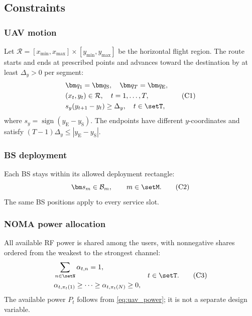 \subsection{Constraints}
\subsubsection{UAV motion}
Let $\mathcal R=[x_{\min},x_{\max}]\times[y_{\min},y_{\max}]$ be the horizontal flight region. The route starts and ends at prescribed points and advances toward the destination by at least $\Delta_y>0$ per segment:
\begin{equation}
\begin{aligned}
&\bm q_1=\bm q_{\mathrm S},\quad \bm q_T=\bm q_{\mathrm E},\\
&(x_t,y_t)\in\mathcal R,\quad t=1,\ldots,T,\\
&s_y(y_{t+1}-y_t)\ge\Delta_y,\quad t\in\setT,
\end{aligned}
\tag{C1}\label{eq:c_motion}
\end{equation}
where $s_y=\operatorname{sign}(y_{\mathrm E}-y_{\mathrm S})$. The endpoints have different $y$-coordinates and satisfy $(T-1)\Delta_y\le|y_{\mathrm E}-y_{\mathrm S}|$.

\subsubsection{BS deployment}
Each BS stays within its allowed deployment rectangle:
\begin{equation}
\bm s_m\in\mathcal B_m,\qquad m\in\setM.
\tag{C2}\label{eq:c_bs}
\end{equation}
The same BS positions apply to every service slot.

\subsubsection{NOMA power allocation}
All available RF power is shared among the users, with nonnegative shares ordered from the weakest to the strongest channel:
\begin{equation}
\begin{aligned}
&\sum_{n\in\setN}\alpha_{t,n}=1,\\
&\alpha_{t,\pi_t(1)}\ge\cdots\ge\alpha_{t,\pi_t(N)}\ge0,
\end{aligned}
\quad t\in\setT.
\tag{C3}\label{eq:c_noma}
\end{equation}
The available power $P_t$ follows from \cref{eq:uav_power}; it is not a separate design variable.

